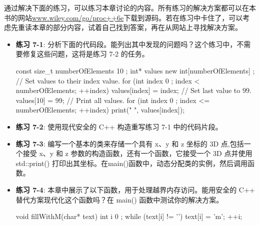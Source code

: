 通过解决下面的练习，可以练习本章讨论的内容。所有练习的解决方案都可以在本书的网站\url{www.wiley.com/go/proc++6e}下载到源码。若在练习中卡住了，可以考虑先重读本章的部分内容，试着自己找到答案，再在从网站上寻找解决方案。

\begin{itemize}
\item
\textbf{练习 7-1}: 分析下面的代码段。能列出其中发现的问题吗？这个练习中，不需要修复这些问题，这将是练习 7-2 的任务。

\begin{cpp}
const size_t numberOfElements { 10 };
int* values { new int[numberOfElements] };
// Set values to their index value.
for (int index { 0 }; index < numberOfElements; ++index) {
    values[index] = index;
}
// Set last value to 99.
values[10] = 99;
// Print all values.
for (int index { 0 }; index <= numberOfElements; ++index) {
    print("{} ", values[index]);
}
\end{cpp}

\item
\textbf{练习 7-2}: 使用现代安全的 C++ 构造重写练习 7-1 中的代码片段。

\item
\textbf{练习 7-3}: 编写一个基本的类来存储一个具有 x、y 和 z 坐标的 3D 点,包括一个接受 x、y 和 z 参数的构造函数，还有一个函数，它接受一个 3D 点并使用 std::print() 打印出其坐标。在main()函数中，动态分配类的实例，然后调用函数。

\item
\textbf{练习 7-4}: 本章中展示了以下函数，用于处理越界内存访问。能用安全的 C++ 替代方案现代化这个函数吗？在 main() 函数中测试你的解决方案。

\begin{cpp}
void fillWithM(char* text)
{
    int i { 0 };
    while (text[i] != '\0') {
        text[i] = 'm';
        ++i;
    }
}
\end{cpp}
\end{itemize}